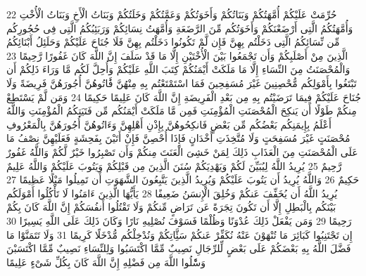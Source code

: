 {\tiny\colorbox{cl_aya}{22}} حُرِّمَتْ عَلَيْكُمْ أُمَّهَتُكُمْ وَبَنَاتُكُمْ وَأَخَوَتُكُمْ وَعَمَّتُكُمْ وَخَلَتُكُمْ وَبَنَاتُ الْأَخِ وَبَنَاتُ الْأُخْتِ وَأُمَّهَتُكُمُ الَّتِى أَرْضَعْنَكُمْ وَأَخَوَتُكُم مِّنَ الرَّضَعَةِ وَأُمَّهَتُ نِسَائِكُمْ وَرَبَئِبُكُمُ الَّتِى فِى حُجُورِكُم مِّن نِّسَائِكُمُ الَّتِى دَخَلْتُم بِهِنَّ فَإِن لَّمْ تَكُونُوا دَخَلْتُم بِهِنَّ فَلَا جُنَاحَ عَلَيْكُمْ وَحَلَئِلُ أَبْنَائِكُمُ الَّذِينَ مِنْ أَصْلَبِكُمْ وَأَن تَجْمَعُوا بَيْنَ الْأُخْتَيْنِ إِلَّا مَا قَدْ سَلَفَ إِنَّ اللَّهَ كَانَ غَفُورًا رَّحِيمًا
{\tiny\colorbox{cl_aya}{23}} وَالْمُحْصَنَتُ مِنَ النِّسَاءِ إِلَّا مَا مَلَكَتْ أَيْمَنُكُمْ كِتَبَ اللَّهِ عَلَيْكُمْ وَأُحِلَّ لَكُم مَّا وَرَاءَ ذَلِكُمْ أَن تَبْتَغُوا بِأَمْوَلِكُم مُّحْصِنِينَ غَيْرَ مُسَفِحِينَ فَمَا اسْتَمْتَعْتُم بِهِ مِنْهُنَّ فََٔاتُوهُنَّ أُجُورَهُنَّ فَرِيضَةً وَلَا جُنَاحَ عَلَيْكُمْ فِيمَا تَرَضَيْتُم بِهِ مِن بَعْدِ الْفَرِيضَةِ إِنَّ اللَّهَ كَانَ عَلِيمًا حَكِيمًا
{\tiny\colorbox{cl_aya}{24}} وَمَن لَّمْ يَسْتَطِعْ مِنكُمْ طَوْلًا أَن يَنكِحَ الْمُحْصَنَتِ الْمُؤْمِنَتِ فَمِن مَّا مَلَكَتْ أَيْمَنُكُم مِّن فَتَيَتِكُمُ الْمُؤْمِنَتِ وَاللَّهُ أَعْلَمُ بِإِيمَنِكُم بَعْضُكُم مِّن بَعْضٍ فَانكِحُوهُنَّ بِإِذْنِ أَهْلِهِنَّ وَءَاتُوهُنَّ أُجُورَهُنَّ بِالْمَعْرُوفِ مُحْصَنَتٍ غَيْرَ مُسَفِحَتٍ وَلَا مُتَّخِذَتِ أَخْدَانٍ فَإِذَا أُحْصِنَّ فَإِنْ أَتَيْنَ بِفَحِشَةٍ فَعَلَيْهِنَّ نِصْفُ مَا عَلَى الْمُحْصَنَتِ مِنَ الْعَذَابِ ذَلِكَ لِمَنْ خَشِىَ الْعَنَتَ مِنكُمْ وَأَن تَصْبِرُوا خَيْرٌ لَّكُمْ وَاللَّهُ غَفُورٌ رَّحِيمٌ
{\tiny\colorbox{cl_aya}{25}} يُرِيدُ اللَّهُ لِيُبَيِّنَ لَكُمْ وَيَهْدِيَكُمْ سُنَنَ الَّذِينَ مِن قَبْلِكُمْ وَيَتُوبَ عَلَيْكُمْ وَاللَّهُ عَلِيمٌ حَكِيمٌ
{\tiny\colorbox{cl_aya}{26}} وَاللَّهُ يُرِيدُ أَن يَتُوبَ عَلَيْكُمْ وَيُرِيدُ الَّذِينَ يَتَّبِعُونَ الشَّهَوَتِ أَن تَمِيلُوا مَيْلًا عَظِيمًا
{\tiny\colorbox{cl_aya}{27}} يُرِيدُ اللَّهُ أَن يُخَفِّفَ عَنكُمْ وَخُلِقَ الْإِنسَنُ ضَعِيفًا
{\tiny\colorbox{cl_aya}{28}} يَأَيُّهَا الَّذِينَ ءَامَنُوا لَا تَأْكُلُوا أَمْوَلَكُم بَيْنَكُم بِالْبَطِلِ إِلَّا أَن تَكُونَ تِجَرَةً عَن تَرَاضٍ مِّنكُمْ وَلَا تَقْتُلُوا أَنفُسَكُمْ إِنَّ اللَّهَ كَانَ بِكُمْ رَحِيمًا
{\tiny\colorbox{cl_aya}{29}} وَمَن يَفْعَلْ ذَلِكَ عُدْوَنًا وَظُلْمًا فَسَوْفَ نُصْلِيهِ نَارًا وَكَانَ ذَلِكَ عَلَى اللَّهِ يَسِيرًا
{\tiny\colorbox{cl_aya}{30}} إِن تَجْتَنِبُوا كَبَائِرَ مَا تُنْهَوْنَ عَنْهُ نُكَفِّرْ عَنكُمْ سَئَِّاتِكُمْ وَنُدْخِلْكُم مُّدْخَلًا كَرِيمًا
{\tiny\colorbox{cl_aya}{31}} وَلَا تَتَمَنَّوْا مَا فَضَّلَ اللَّهُ بِهِ بَعْضَكُمْ عَلَى بَعْضٍ لِّلرِّجَالِ نَصِيبٌ مِّمَّا اكْتَسَبُوا وَلِلنِّسَاءِ نَصِيبٌ مِّمَّا اكْتَسَبْنَ وَسَْٔلُوا اللَّهَ مِن فَضْلِهِ إِنَّ اللَّهَ كَانَ بِكُلِّ شَىْءٍ عَلِيمًا
